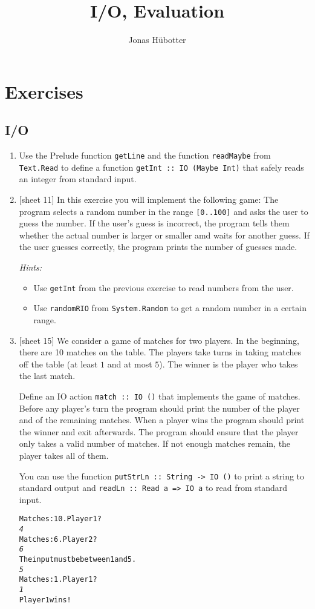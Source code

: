 \documentclass{article}
\title{I/O, Evaluation}
\author{Jonas Hübotter}
\def\code#1{\texttt{#1}}
\begin{document}
\maketitle

\section{Exercises}

\subsection{I/O}
\begin{enumerate}
    \item Use the Prelude function \code{getLine} and the function \code{readMaybe} from \code{Text.Read} to define a function \code{getInt :: IO (Maybe Int)} that safely reads an integer from standard input.

    \item {[sheet 11]} In this exercise you will implement the following game: The program selects a random number in the range \code{[0..100]} and asks the user to guess the number. If the user's guess is incorrect, the program tells them whether the actual number is larger or smaller amd waits for another guess. If the user guesses correctly, the program prints the number of guesses made. \par
        \textit{Hints:}
        \begin{itemize}
            \item Use \code{getInt} from the previous exercise to read numbers from the user.
            \item Use \code{randomRIO} from \code{System.Random} to get a random number in a certain range.
        \end{itemize}

    \item {[sheet 15]} We consider a game of matches for two players. In the beginning, there are 10 matches on the table. The players take turns in taking matches off the table (at least $1$ and at most $5$). The winner is the player who takes the last match. \par
        Define an IO action \code{match :: IO ()} that implements the game of matches. Before any player's turn the program should print the number of the player and of the remaining matches. When a player wins the program should print the winner and exit afterwards. The program should ensure that the player only takes a valid number of matches. If not enough matches remain, the player takes all of them. \par
        You can use the function \code{putStrLn :: String -> IO ()} to print a string to standard output and \code{readLn :: Read a => IO a} to read from standard input.
        \begin{alltt}
    Matches: 10. Player 1?
    \textit{4}
    Matches: 6. Player 2?
    \textit{6}
    The input must be between 1 and 5.
    \textit{5}
    Matches: 1. Player 1?
    \textit{1}
    Player 1 wins!
        \end{alltt}
\end{enumerate}
\end{document}
